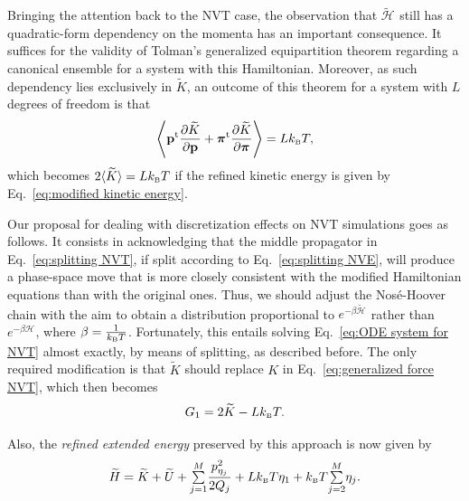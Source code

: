 \documentclass[
journal=jctcce,
layout=twocolumn
]{achemso}
\newcommand{\vt}[1]{\boldsymbol{\mathbf{#1}}}   %
\newcommand{\tr}[1]{#1^\text{t}}                %
\newcommand{\diff}[2]{\frac{\partial #1}{\partial #2}} %
\newcommand{\Ham}[1]{{\mathcal H}_\text{#1}}    %
\newcommand{\refined}[1]{\widetilde{#1}}
\begin{document}
Bringing the attention back to the NVT case, the observation that $\refined{\Ham{}}$ still has a quadratic-form dependency on the momenta has an important consequence.
It suffices for the validity of Tolman's generalized equipartition theorem \cite{Tolman_1918, Uline_2008, Eastwood_2010} regarding a canonical ensemble for a system with this Hamiltonian.
Moreover, as such dependency lies exclusively in $\refined K$, an outcome of this theorem for a system with $L$ degrees of freedom is that
\begin{equation*}
\left\langle \tr{\vt p} \diff{\refined K}{\vt p} + \tr{\vt \pi} \diff{\refined K}{\vt \pi} \right\rangle = L k_\text{\tiny B} T,
\end{equation*}
which becomes $2\langle \refined{K} \rangle = L k_\text{\tiny B} T$ if the refined kinetic energy is given by Eq.~\eqref{eq:modified kinetic energy}.

Our proposal for dealing with discretization effects on NVT simulations goes as follows.
It consists in acknowledging that the middle propagator in Eq.~\eqref{eq:splitting NVT}, if split according to Eq.~\eqref{eq:splitting NVE}, will produce a phase-space move that is more closely consistent with the modified Hamiltonian equations than with the original ones.
Thus, we should adjust the Nos\'e-Hoover chain with the aim to obtain a distribution proportional to $e^{-\beta \refined{\Ham{}}}$ rather than $e^{-\beta \Ham{}}$, where $\beta = \frac{1}{k_\text{\tiny B} T}$.
Fortunately, this entails solving Eq.~\eqref{eq:ODE system for NVT} almost exactly, by means of splitting, as described before.
The only required modification is that $\refined K$ should replace $K$ in Eq.~\eqref{eq:generalized force NVT}, which then becomes
\begin{equation}
\label{eq:thermostat_force}
G_1 = 2 \refined K - L k_\text{\tiny B} T.
\end{equation}

Also, the \textit{refined extended energy} preserved by this approach is now given by
\begin{equation}
\label{eq:this extended energy}
\widetilde{H} = \refined K + \refined U + {\textstyle\sum\limits_{j=1}^{M}} \frac{p_{\eta_j}^2}{2Q_j} + L k_\text{\tiny B} T\eta_1 + k_\text{\tiny B} T {\textstyle\sum\limits_{j=2}^{M}} \eta_j.
\end{equation}
\end{document}
